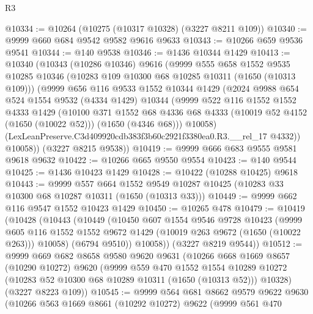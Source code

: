 \begin{lexlean}{R3}
\begin{coremodule}
@10334 := @10264 (@10275 (@10317 @10328) (@3227 @8211 @109))
@10340 := @9999 @660 @684 @9542 @9582 @9616 @9633
@10343 := @10266 @659 @9536 @9541
@10344 := @140 @9538
@10346 := @1436 @10344 @1429
@10413 := @10340
    (@10343
      (@10286 @10346)
      @9616
      (@9999
        @555
        @658
        @1552
        @9535
        @10285
        @10346
        (@10283 @109 @10300 @68 @10285 @10311 (@1650 (@10313 @109)))
        (@9999
          @656
          @116
          @9533
          @1552
          @10344
          @1429
          (@2024
            @9988
            @654
            @524
            @1554
            @9532
            (@4334 @1429)
            @10344
            (@9999
              @522
              @116
              @1552
              @1552
              @4333
              @1429
              (@10100
                @371
                @1552
                @68
                @4336
                @68
                @4333
                (@10019 @52 @4152 (@1650 (@10022 @52)))
                (@1650 (@4346 @68)))
              @10058)
            (LexLeanPreserve.C3d409920cdb383f3b60c2921f3380ea0.R3.__rel_17 @4332))
          @10058))
      (@3227 @8215 @9538))
@10419 := @9999 @666 @683 @9555 @9581 @9618 @9632
@10422 := @10266 @665 @9550 @9554
@10423 := @140 @9544
@10425 := @1436 @10423 @1429
@10428 := @10422 (@10288 @10425) @9618
@10443 := @9999
    @557
    @664
    @1552
    @9549
    @10287
    @10425
    (@10283 @33 @10300 @68 @10287 @10311 (@1650 (@10313 @33)))
@10449 := @9999 @662 @116 @9547 @1552 @10423 @1429
@10450 := @10265 @478
@10479 := @10419
    (@10428
      (@10443
        (@10449
          (@10450
            @607
            @1554
            @9546
            @9728
            @10423
            (@9999
              @605
              @116
              @1552
              @1552
              @9672
              @1429
              (@10019 @263 @9672 (@1650 (@10022 @263)))
              @10058)
            (@6794 @9510))
          @10058))
      (@3227 @8219 @9544))
@10512 := @9999
    @669
    @682
    @8658
    @9580
    @9620
    @9631
    (@10266
      @668
      @1669
      @8657
      (@10290 @10272)
      @9620
      (@9999
        @559
        @470
        @1552
        @1554
        @10289
        @10272
        (@10283 @52 @10300 @68 @10289 @10311 (@1650 (@10313 @52)))
        @10328)
      (@3227 @8223 @109))
@10545 := @9999
    @564
    @681
    @8662
    @9579
    @9622
    @9630
    (@10266
      @563
      @1669
      @8661
      (@10292 @10272)
      @9622
      (@9999
        @561
        @470

\end{coremodule}
\end{lexlean}
